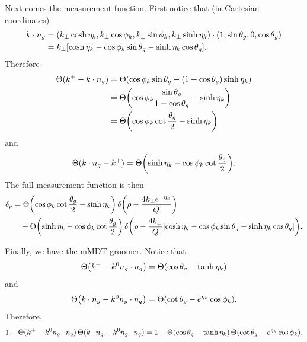 \documentclass[11pt,twoside,reqno]{amsart}
\theoremstyle{plain}
\theoremstyle{remark}
\theoremstyle{definition}
\theoremstyle{remark}
\theoremstyle{definition}
\theoremstyle{definition}
\begin{document}
	Next comes the measurement function. First notice that (in Cartesian coordinates)
	\begin{equation}
	\begin{aligned}
		k \cdot n_g &= (k_\perp \cosh\eta_k, k_\perp \cos\phi_k, k_\perp \sin\phi_k, k_\perp\sinh\eta_k) \cdot (1, \sin\theta_g, 0, \cos\theta_g) \\
		&= k_\perp \qty[\cosh\eta_k - \cos\phi_k \sin\theta_g - \sinh\eta_k \cos\theta_g].
	\end{aligned}
	\end{equation}
	Therefore
	\begin{equation}
	\begin{aligned}
		\Theta(k^+ - k\cdot n_g) &= \Theta\qty(\cos\phi_k \sin\theta_g - (1- \cos\theta_g)\sinh\eta_k) \\
		&= \Theta\qty(\cos\phi_k\frac{\sin\theta_g}{1 - \cos\theta_g} - \sinh\eta_k) \\
		&= \Theta\qty(\cos\phi_k\cot\frac{\theta_g}{2} - \sinh\eta_k)
	\end{aligned}
	\end{equation}
	and
	\begin{equation}
		\Theta(k\cdot n_g - k^+) = \Theta\qty(\sinh\eta_k - \cos\phi_k\cot\frac{\theta_g}{2}).
	\end{equation}
	The full measurement function is then
	\begin{equation}
	\begin{aligned}
		\delta_\rho &= \Theta\qty(\cos\phi_k\cot\frac{\theta_g}{2} - \sinh\eta_k)\,\delta\qty(\rho - \frac{4 k_\perp e^{-\eta_k}}{Q}) \\
			&\quad+ \Theta\qty(\sinh\eta_k - \cos\phi_k\cot\frac{\theta_g}{2})\, \delta\qty(\rho - \frac{4 k_\perp}{Q}\qty[\cosh\eta_k - \cos\phi_k\sin\theta_g - \sinh\eta_k\cos\theta_g]).
	\end{aligned}
	\end{equation}

	Finally, we have the mMDT groomer. Notice that
	\begin{equation}
		\Theta\qty(k^+ - k^0 n_g \cdot n_q) = \Theta(\cos\theta_g - \tanh\eta_k)
	\end{equation}
	and
	\begin{equation}
		\Theta\qty(k\cdot n_g - k^0 n_g \cdot n_q) = \Theta\qty(\cot\theta_g - e^{\eta_k}\cos\phi_k).
	\end{equation}
	Therefore,
	\begin{equation}
		1 - \Theta(k^+ - k^0 n_g \cdot n_q)\,\Theta(k \cdot n_g - k^0 n_g \cdot n_q) = 1 - \Theta(\cos\theta_g - \tanh\eta_k)\,\Theta\qty(\cot\theta_g - e^{\eta_k}\cos\phi_k).
	\end{equation}
\end{document}
